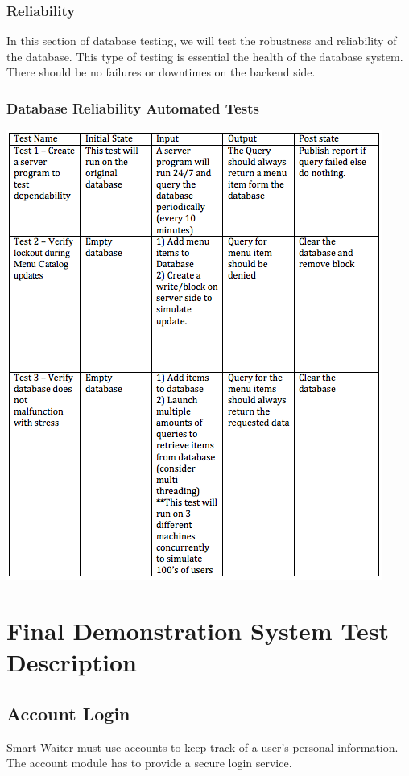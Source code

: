 \documentclass[12pt]{article}
\begin{document}
\subsubsection{Reliability}
In this section of database testing, we will test the robustness and reliability of the database.  This type of testing is essential the health of the database system. There should be no failures or downtimes on the backend side. 
\subsubsection{Database Reliability Automated Tests }
\includegraphics[width=\textwidth,height=\textheight,keepaspectratio]{reliability_tests.png}

\section{Final Demonstration System Test Description}

\subsection{Account Login}
Smart-Waiter must use accounts to keep track of a user's personal information. The account module has to provide a secure login service. 
\end{document}
